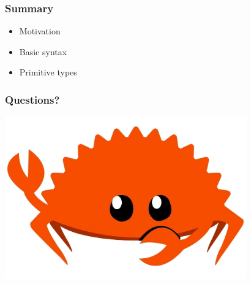 \documentclass[aspectratio=1610,t]{beamer}
\begin{document}

\begin{frame}
\frametitle{Summary}
\begin{itemize}
    \item Motivation
    \item Basic syntax
    \item Primitive types
\end{itemize}
\end{frame}


\begin{frame}
\frametitle{Questions?}
\begin{center}
\includegraphics[width=\textwidth,height=7cm,keepaspectratio]{images/crab.jpg}
\end{center}
\end{frame}

\end{document}

